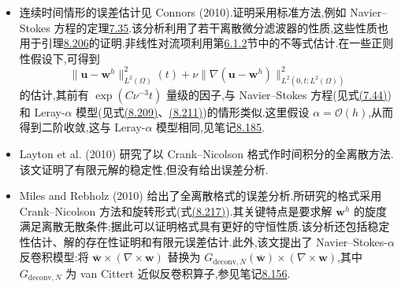 \begin{note}[有限元分析的其他结果]
\label{note:navier-stokes-alpha-fem-further-results}
\begin{itemize}
\item 连续时间情形的误差估计见 Connors (2010).证明采用标准方法,例如 Navier--Stokes 方程的定理\hyperref[thm:time-dependent-fem-velocity-error]{7.35}.该分析利用了若干离散微分滤波器的性质,这些性质也用于引理\hyperref[lem:navier-stokes-alpha-fem-existence-stability]{8.206}的证明.非线性对流项利用第\hyperref[subsec:steady-ns-nonlinear-term]{6.1.2}节中的不等式估计.在一些正则性假设下,可得到
\[
 \|\bm{u}-\bm{w}^h\|_{L^2(\Omega)}^2(t)
  +\nu\|\nabla(\bm{u}-\bm{w}^h)\|_{L^2(0,t;L^2(\Omega))}^2
\]
的估计,其前有 $\exp(C\nu^{-3}t)$ 量级的因子,与 Navier--Stokes 方程(见式\hyperref[eq:time-dependent-fem-velocity-error]{(7.44)})和 Leray-$\alpha$ 模型(见式\hyperref[eq:leray-alpha-fem-error-estimate-weak-regularity]{(8.209)}、\hyperref[eq:leray-alpha-fem-error-estimate-strong-regularity]{(8.211)})的情形类似.这里假设 $\alpha=\mathcal{O}(h)$,从而得到二阶收敛,这与 Leray-$\alpha$ 模型相同,见笔记\hyperref[note:leray-alpha-optimal-alpha-choice]{8.185}.
\item Layton et al. (2010) 研究了以 Crank--Nicolson 格式作时间积分的全离散方法.该文证明了有限元解的稳定性,但没有给出误差分析.
\item Miles and Rebholz (2010) 给出了全离散格式的误差分析.所研究的格式采用 Crank--Nicolson 方法和旋转形式(式\hyperref[eq:navier-stokes-alpha-rotational-form]{(8.217)}).其关键特点是要求解 $\bm{w}^h$ 的旋度满足离散无散条件;据此可以证明格式具有更好的守恒性质.该分析还包括稳定性估计、解的存在性证明和有限元误差估计.此外,该文提出了 Navier--Stokes-$\alpha$ 反卷积模型:将 $\overline{\bm{w}}\times(\nabla\times\bm{w})$ 替换为 $G_{\mathrm{deconv},N}(\overline{\bm{w}})\times(\nabla\times\bm{w})$,其中 $G_{\mathrm{deconv},N}$ 为 van Cittert 近似反卷积算子,参见笔记\hyperref[note:van-cittert-approximate-deconvolution]{8.156}.
\end{itemize}
\end{note}

